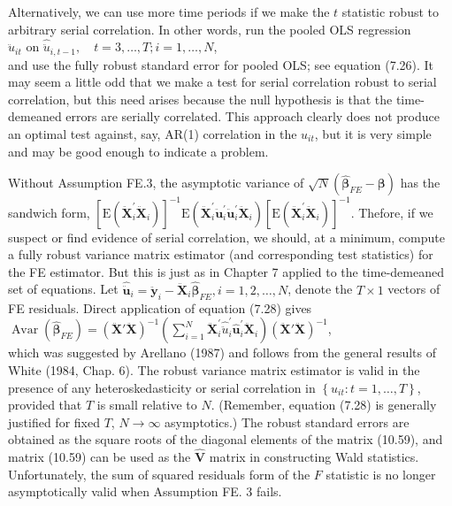 \documentclass[10pt]{article}
\begin{document}
Alternatively, we can use more time periods if we make the $t$ statistic robust to arbitrary serial correlation. In other words, run the pooled OLS regression\\
$\hat{\ddot{u}}_{i t}$ on $\hat{\ddot{u}}_{i, t-1}, \quad t=3, \ldots, T ; i=1, \ldots, N$,\\
and use the fully robust standard error for pooled OLS; see equation (7.26). It may seem a little odd that we make a test for serial correlation robust to serial correlation, but this need arises because the null hypothesis is that the time-demeaned errors are serially correlated. This approach clearly does not produce an optimal test against, say, AR(1) correlation in the $u_{i t}$, but it is very simple and may be good enough to indicate a problem.

Without Assumption FE.3, the asymptotic variance of $\sqrt{N}\left(\hat{\boldsymbol{\beta}}_{F E}-\boldsymbol{\beta}\right)$ has the sandwich form, $\left[\mathrm{E}\left(\ddot{\mathbf{X}}_{i}^{\prime} \ddot{\mathbf{X}}_{i}\right)\right]^{-1} \mathrm{E}\left(\ddot{\mathbf{X}}_{i}^{\prime} \ddot{\mathbf{u}}_{i}^{\prime} \ddot{\mathbf{u}}_{i}^{\prime} \ddot{\mathbf{X}}_{i}\right)\left[\mathrm{E}\left(\ddot{\mathbf{X}}_{i}^{\prime} \ddot{\mathbf{X}}_{i}\right)\right]^{-1}$. Thefore, if we suspect or find evidence of serial correlation, we should, at a minimum, compute a fully robust variance matrix estimator (and corresponding test statistics) for the FE estimator. But this is just as in Chapter 7 applied to the time-demeaned set of equations. Let $\hat{\ddot{\mathbf{u}}}_{i}=\ddot{\mathbf{y}}_{i}-\ddot{\mathbf{X}}_{i} \hat{\boldsymbol{\beta}}_{F E}, i=1,2, \ldots, N$, denote the $T \times 1$ vectors of FE residuals. Direct application of equation (7.28) gives\\
$\operatorname{Avar}\left(\hat{\boldsymbol{\beta}}_{F E}\right)=(\ddot{\mathbf{X}} \prime \ddot{\mathbf{X}})^{-1}\left(\sum_{i=1}^{N} \ddot{\mathbf{X}}_{i}^{\prime} \hat{\ddot{u}}_{i}^{\prime} \hat{\mathbf{u}}_{i}^{\prime} \ddot{\mathbf{X}}_{i}\right)(\ddot{\mathbf{X}} \prime \ddot{\mathbf{X}})^{-1}$,\\
which was suggested by Arellano (1987) and follows from the general results of White (1984, Chap. 6). The robust variance matrix estimator is valid in the presence of any heteroskedasticity or serial correlation in $\left\{u_{i t}: t=1, \ldots, T\right\}$, provided that $T$ is small relative to $N$. (Remember, equation (7.28) is generally justified for fixed $T$, $N \rightarrow \infty$ asymptotics.) The robust standard errors are obtained as the square roots of the diagonal elements of the matrix (10.59), and matrix (10.59) can be used as the $\hat{\mathbf{V}}$ matrix in constructing Wald statistics. Unfortunately, the sum of squared residuals form of the $F$ statistic is no longer asymptotically valid when Assumption FE. 3 fails.
\end{document}
